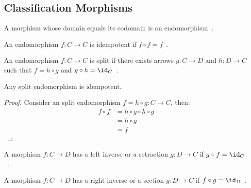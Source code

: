 \subsection{Classification Morphisms}

\begin{definition}[Endomorphism]
  A morphism whose domain equals its codomain is an
  endomorphism~\parencite[p.~7]{riehl:category_theory_in_context}.
\end{definition}

\begin{definition}[Idempotent]
  An endomorphism $f:C\to C$ is idempotent if $f\circ f =
  f$~\parencite[p.~20]{lane:working_mathematician}.
\end{definition}

\begin{definition}[Split]
  An endomorphism $f:C\to C$ is split if there exists arrows $g:C\to D$ and
  $h:D\to C$ such that $f=h\circ g$ and $g\circ h=
  \id_{C}$~\parencite[p.~20]{lane:working_mathematician}.
\end{definition}

\begin{theorem}
  Any split endomorphism is idempotent.

  \begin{proof}
    Consider an split endomorphism $f=h\circ g:C\to C$, then:
    \[
      \begin{aligned}
        f\circ f &= h\circ g \circ h\circ g\\
        &= h\circ g\\
        &= f
      \end{aligned}
    \]
  \end{proof}
  \vspace{-1.5\baselineskip}
\end{theorem}

\begin{definition}
  A morphism $f: C\to D$ has a left inverse or a retraction $g: D\to C$ if
  $g\circ f = \id_C$~\parencite[p.~19]{lane:working_mathematician}.
\end{definition}

\begin{definition}
  A morphism $f: C\to D$ has a right inverse or a section $g: D\to C$ if
  $f\circ g = \id_{D}$~\parencite[p.~19]{lane:working_mathematician}.
\end{definition}

